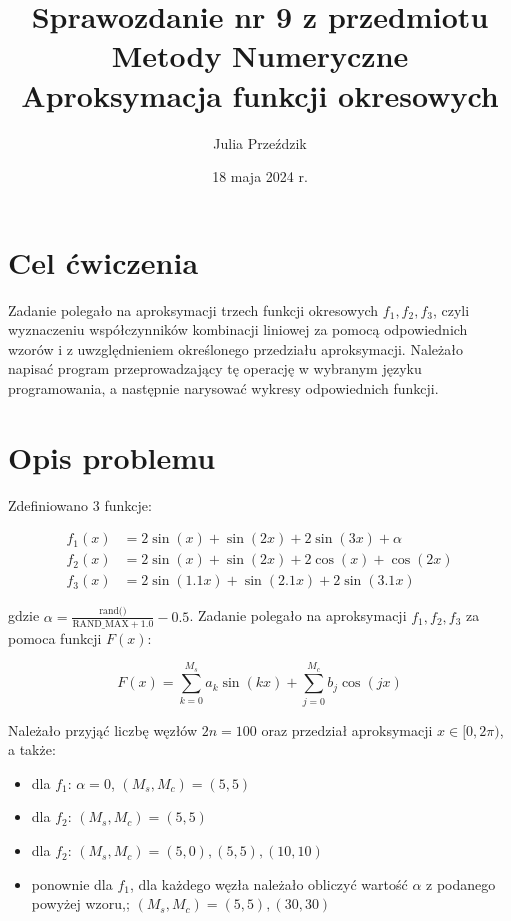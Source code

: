 \documentclass{article}
\begin{document}
\Large

\title{\LARGE Sprawozdanie nr 9 z przedmiotu Metody Numeryczne\\
       \LARGE Aproksymacja funkcji okresowych}
\author{Julia Przeździk}
\date{18 maja 2024 r.}
\maketitle

\large

\section{Cel ćwiczenia}

Zadanie polegało na aproksymacji trzech funkcji okresowych $f_1, f_2, f_3$, czyli wyznaczeniu współczynników kombinacji liniowej za pomocą odpowiednich wzorów i z uwzględnieniem określonego przedziału aproksymacji. Należało napisać program przeprowadzający tę operację w wybranym języku programowania, a następnie narysować wykresy odpowiednich funkcji.

\section{Opis problemu}
Zdefiniowano 3 funkcje: 

\begin{equation*}
\begin{aligned}
f_1(x) &= 2\sin(x) + \sin(2x) + 2\sin(3x) + \alpha \\
f_2(x) &= 2\sin(x) + \sin(2x) + 2\cos(x) + \cos(2x) \\
f_3(x) &= 2\sin(1.1x) + \sin(2.1x) + 2\sin(3.1x)
\end{aligned}
\end{equation*}

\noindent
gdzie $\alpha = \frac{\text{rand()}}{\text{RAND\_MAX} + 1.0} - 0.5$. Zadanie polegało na aproksymacji $f_1, f_2, f_3$ za pomoca funkcji $F(x)$:

\begin{equation*}
F(x) = \sum_{k=0}^{M_s} a_k \sin(kx) + \sum_{j=0}^{M_c} b_j \cos(jx)
\end{equation*}

\noindent
Należało przyjąć liczbę węzłów $2n = 100$ oraz przedział aproksymacji $x \in [0, 2\pi)$, a także:
\begin{itemize}
    \item dla $f_1$: $\alpha = 0$, $(M_s, M_c) = {(5,5)}$
    \item dla $f_2$: $(M_s, M_c) = {(5,5)}$
    \item dla $f_2$: $(M_s, M_c) = {(5,0),(5,5), (10, 10)}$
    \item ponownie dla $f_1$, dla każdego węzła należało obliczyć wartość $\alpha$ z podanego powyżej wzoru,; $(M_s, M_c) = {(5,5),(30,30)}$
\end{itemize}
\end{document}
